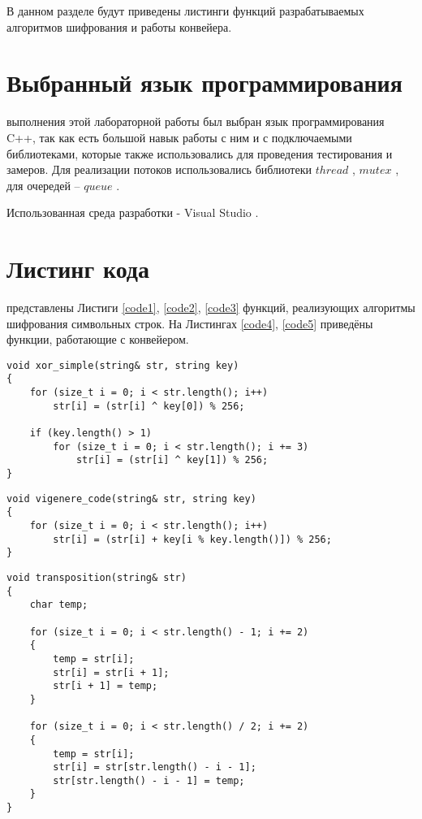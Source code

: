 В данном разделе будут приведены листинги функций разрабатываемых алгоритмов шифрования и работы конвейера.

\section{Выбранный язык программирования}
 выполнения этой лабораторной работы был выбран язык программирования C++, так как есть большой навык работы с ним и с подключаемыми библиотеками, которые также использовались для проведения тестирования и замеров. Для реализации потоков использовались библиотеки $thread$ \cite{thread}, $mutex$ \cite{mutex}, для очередей -- $queue$ \cite{queue}. 

Использованная среда разработки - Visual Studio \cite{Visual}.

\section{Листинг кода}
 представлены Листиги \ref{code1}, \ref{code2}, \ref{code3} функций, реализующих алгоритмы шифрования символьных строк. На Листингах \ref{code4}, \ref{code5} приведёны функции, работающие с конвейером. 

\begin{lstlisting}[label=code1, caption = Алгоритм c использованием операции XOR]
void xor_simple(string& str, string key)
{
	for (size_t i = 0; i < str.length(); i++)
		str[i] = (str[i] ^ key[0]) % 256;
	
	if (key.length() > 1)
		for (size_t i = 0; i < str.length(); i += 3)
			str[i] = (str[i] ^ key[1]) % 256;
}
\end{lstlisting}


\begin{lstlisting}[label=code2, caption = Шифр Виженера]
void vigenere_code(string& str, string key)
{
	for (size_t i = 0; i < str.length(); i++)
		str[i] = (str[i] + key[i % key.length()]) % 256;
}
\end{lstlisting}


\begin{lstlisting}[label=code3, caption = Транспозиция]
void transposition(string& str)
{
	char temp;
	
	for (size_t i = 0; i < str.length() - 1; i += 2)
	{
		temp = str[i];
		str[i] = str[i + 1];
		str[i + 1] = temp;
	}
	
	for (size_t i = 0; i < str.length() / 2; i += 2)
	{
		temp = str[i];
		str[i] = str[str.length() - i - 1];
		str[str.length() - i - 1] = temp;
	}
}
\end{lstlisting}


